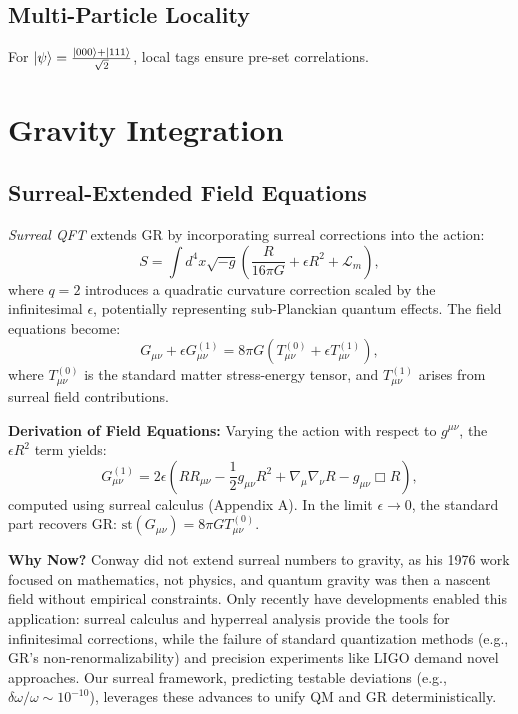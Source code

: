 \documentclass{article}
\begin{document}
\subsection{Multi-Particle Locality}
For \(\ket{\psi} = \frac{\ket{000} + \ket{111}}{\sqrt{2}}\), local tags ensure pre-set correlations.

\section{Gravity Integration}
\subsection{Surreal-Extended Field Equations}
\textit{Surreal QFT} extends GR by incorporating surreal corrections into the action:
\begin{equation}
S = \int d^4x \sqrt{-g} \left( \frac{R}{16\pi G} + \epsilon R^2 + \mathcal{L}_m \right),
\end{equation}
where \( q = 2 \) introduces a quadratic curvature correction scaled by the infinitesimal \(\epsilon\), potentially representing sub-Planckian quantum effects. The field equations become:
\begin{equation}
G_{\mu\nu} + \epsilon G_{\mu\nu}^{(1)} = 8\pi G \left( T_{\mu\nu}^{(0)} + \epsilon T_{\mu\nu}^{(1)} \right),
\end{equation}
where \( T_{\mu\nu}^{(0)} \) is the standard matter stress-energy tensor, and \( T_{\mu\nu}^{(1)} \) arises from surreal field contributions.

\textbf{Derivation of Field Equations:} Varying the action with respect to \( g^{\mu\nu} \), the \(\epsilon R^2\) term yields:
\[
G_{\mu\nu}^{(1)} = 2\epsilon \left( R R_{\mu\nu} - \frac{1}{2} g_{\mu\nu} R^2 + \nabla_\mu \nabla_\nu R - g_{\mu\nu} \Box R \right),
\]
computed using surreal calculus (Appendix A). In the limit \(\epsilon \to 0\), the standard part recovers GR: \(\text{st}(G_{\mu\nu}) = 8\pi G T_{\mu\nu}^{(0)}\).

\textbf{Why Now?} Conway did not extend surreal numbers to gravity, as his 1976 work focused on mathematics, not physics, and quantum gravity was then a nascent field without empirical constraints. Only recently have developments enabled this application: surreal calculus \cite{Ehrlich2012} and hyperreal analysis \cite{Goldblatt1998} provide the tools for infinitesimal corrections, while the failure of standard quantization methods (e.g., GR's non-renormalizability) and precision experiments like LIGO \cite{LIGO2016} demand novel approaches. Our surreal framework, predicting testable deviations (e.g., \(\delta \omega / \omega \sim 10^{-10}\)), leverages these advances to unify QM and GR deterministically.
\end{document}
